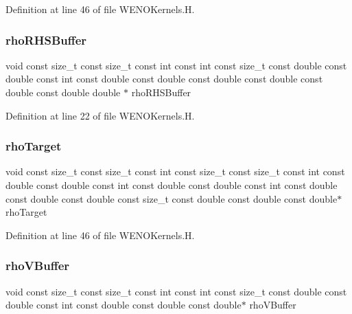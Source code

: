 Definition at line 46 of file W\+E\+N\+O\+Kernels.\+H.

\hypertarget{WENOKernels_8H_ad9842c03322c56f00f61876867bba3c6}{}\label{WENOKernels_8H_ad9842c03322c56f00f61876867bba3c6} 
\subsubsection{\texorpdfstring{rho\+R\+H\+S\+Buffer}{rhoRHSBuffer}}
{\footnotesize\ttfamily void const size\+\_\+t const size\+\_\+t const int const int const size\+\_\+t const double const double const int const double const double const double const double const double const double double $\ast$ rho\+R\+H\+S\+Buffer}



Definition at line 22 of file W\+E\+N\+O\+Kernels.\+H.

\hypertarget{WENOKernels_8H_a65e35e96da987b91dd8e3df4434b6308}{}\label{WENOKernels_8H_a65e35e96da987b91dd8e3df4434b6308} 
\subsubsection{\texorpdfstring{rho\+Target}{rhoTarget}}
{\footnotesize\ttfamily void const size\+\_\+t const size\+\_\+t const int const size\+\_\+t const size\+\_\+t const int const double const double const int const double const double const int const double const double const double const size\+\_\+t const double const double const double$\ast$ rho\+Target}



Definition at line 46 of file W\+E\+N\+O\+Kernels.\+H.

\hypertarget{WENOKernels_8H_aaddaafee4b407fa52d0756171ec50a51}{}\label{WENOKernels_8H_aaddaafee4b407fa52d0756171ec50a51} 
\subsubsection{\texorpdfstring{rho\+V\+Buffer}{rhoVBuffer}}
{\footnotesize\ttfamily void const size\+\_\+t const size\+\_\+t const int const int const size\+\_\+t const double const double const int const double const double const double$\ast$ rho\+V\+Buffer}



